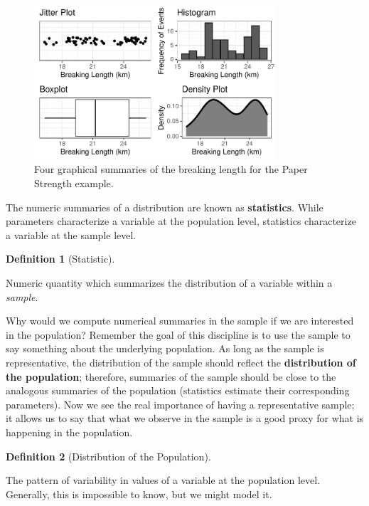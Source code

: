 \documentclass[
  letterpaper,
  DIV=11,
  numbers=noendperiod]{scrreprt}
\theoremstyle{definition}
\newtheorem{definition}{Definition}[chapter]
\theoremstyle{plain}
\theoremstyle{definition}
\theoremstyle{remark}
\begin{document}
\begin{figure}

{\centering \includegraphics[width=0.8\textwidth,height=\textheight]{./images/fig-summaries-univariate-1.pdf}

}

\caption{\label{fig-summaries-univariate}Four graphical summaries of the
breaking length for the Paper Strength example.}

\end{figure}

The numeric summaries of a distribution are known as
\textbf{statistics}. While parameters characterize a variable at the
population level, statistics characterize a variable at the sample
level.

\begin{definition}[Statistic]\protect\hypertarget{def-statistic}{}\label{def-statistic}

Numeric quantity which summarizes the distribution of a variable within
a \emph{sample}.

\end{definition}

Why would we compute numerical summaries in the sample if we are
interested in the population? Remember the goal of this discipline is to
use the sample to say something about the underlying population. As long
as the sample is representative, the distribution of the sample should
reflect the \textbf{distribution of the population}; therefore,
summaries of the sample should be close to the analogous summaries of
the population (statistics estimate their corresponding parameters). Now
we see the real importance of having a representative sample; it allows
us to say that what we observe in the sample is a good proxy for what is
happening in the population.

\begin{definition}[Distribution of the
Population]\protect\hypertarget{def-distribution-population}{}\label{def-distribution-population}

The pattern of variability in values of a variable at the population
level. Generally, this is impossible to know, but we might model it.

\end{definition}
\end{document}
